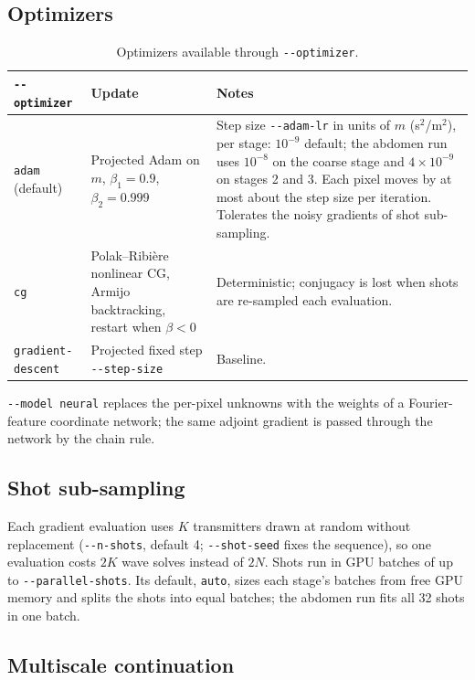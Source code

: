 \documentclass[11pt]{article}
\newcommand{\code}[1]{\texttt{#1}}
\begin{document}
\subsection{Optimizers}

\begin{table}[ht]
\centering
\small
\caption{Optimizers available through \code{-{}-optimizer}.}
\label{tab:optimizers}
\begin{tabular}{@{}p{}p{}p{}@{}}
\toprule
\code{-{}-optimizer} & Update & Notes \\
\midrule
\code{adam} (default) & Projected Adam on $m$, $\beta_1 = 0.9$, $\beta_2 = 0.999$ &
  Step size \code{-{}-adam-lr} in units of $m$ (s$^2$/m$^2$), per stage:
  $10^{-9}$ default; the abdomen run uses $10^{-8}$ on the coarse stage and
  $4\times10^{-9}$ on stages 2 and 3. Each pixel moves by at most about the step size
  per iteration. Tolerates the noisy gradients of shot sub-sampling. \\
\code{cg} & Polak--Ribi\`ere nonlinear CG, Armijo backtracking, restart when $\beta < 0$ &
  Deterministic; conjugacy is lost when shots are re-sampled each evaluation. \\
\code{gradient-descent} & Projected fixed step \code{-{}-step-size} & Baseline. \\
\bottomrule
\end{tabular}
\end{table}

\code{-{}-model neural} replaces the per-pixel unknowns with the weights of a
Fourier-feature coordinate network; the same adjoint gradient is passed through
the network by the chain rule.

\subsection{Shot sub-sampling}

Each gradient evaluation uses $K$ transmitters drawn at random without
replacement (\code{-{}-n-shots}, default 4; \code{-{}-shot-seed} fixes the
sequence), so one evaluation costs $2K$ wave solves instead of $2N$. Shots run
in GPU batches of up to \code{-{}-parallel-shots}. Its default,
\code{auto}, sizes each stage's batches from free GPU memory and splits the
shots into equal batches; the abdomen run fits all 32 shots in one batch.

\subsection{Multiscale continuation}
\end{document}
